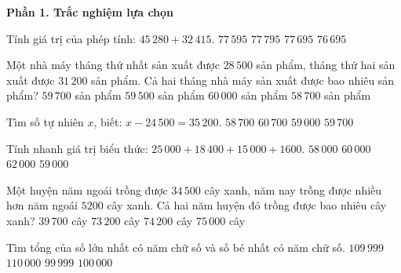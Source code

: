 \textbf{Phần 1. Trắc nghiệm lựa chọn}

\begin{ex} %
Tính giá trị của phép tính: $45\,280 + 32\,415$.
\choice
{$77\,595$}
{$77\,795$}
{\True $77\,695$}
{$76\,695$}
\end{ex}

\begin{ex} %
Một nhà máy tháng thứ nhất sản xuất được $28\,500$ sản phẩm, tháng thứ hai sản xuất được $31\,200$ sản phẩm. Cả hai tháng nhà máy sản xuất được bao nhiêu sản phẩm?
\choice
{\True $59\,700$ sản phẩm}
{$59\,500$ sản phẩm}
{$60\,000$ sản phẩm}
{$58\,700$ sản phẩm}
\end{ex}

\begin{ex} %
Tìm số tự nhiên $x$, biết: $x - 24\,500 = 35\,200$.
\choice
{$58\,700$}
{$60\,700$}
{$59\,000$}
{\True $59\,700$}
\end{ex}

\begin{ex} %
Tính nhanh giá trị biểu thức: $25\,000 + 18\,400 + 15\,000 + 1600$.
\choice
{$58\,000$}
{\True $60\,000$}
{$62\,000$}
{$59\,000$}
\end{ex}

\begin{ex} %
Một huyện năm ngoái trồng được $34\,500$ cây xanh, năm nay trồng được nhiều hơn năm ngoái $5200$ cây xanh. Cả hai năm huyện đó trồng được bao nhiêu cây xanh?
\choice
{$39\,700$ cây}
{$73\,200$ cây}
{\True $74\,200$ cây}
{$75\,000$ cây}
\end{ex}

\begin{ex} %
Tìm tổng của số lớn nhất có năm chữ số và số bé nhất có năm chữ số.
\choice
{\True $109\,999$}
{$110\,000$}
{$99\,999$}
{$100\,000$}
\end{ex}

